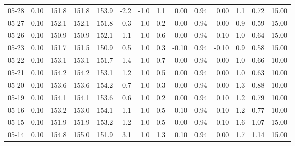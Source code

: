 \begin{threeparttable}
{\begin{tabular}{lrrrrrrrrrrrrr}
  05-28 &     0.10 & 151.8 & 151.8 & 153.9 &       -2.2 &                     -1.0 &                 1.1 &       0.00 &      0.94 &           0.00 &              1.1 &            0.72 &                  15.00 \\
  05-27 &     0.10 & 152.1 & 152.1 & 151.8 &        0.3 &                      1.0 &                 0.2 &       0.00 &      0.94 &           0.00 &              0.9 &            0.59 &                  15.00 \\
  05-26 &     0.10 & 150.9 & 150.9 & 152.1 &       -1.1 &                     -1.0 &                 0.6 &       0.00 &      0.94 &           0.10 &              1.0 &            0.64 &                  15.00 \\
  05-23 &     0.10 & 151.7 & 151.5 & 150.9 &        0.5 &                      1.0 &                 0.3 &      -0.10 &      0.94 &          -0.10 &              0.9 &            0.58 &                  15.00 \\
  05-22 &     0.10 & 153.1 & 153.1 & 151.7 &        1.4 &                      1.0 &                 0.7 &       0.00 &      0.94 &           0.00 &              1.0 &            0.66 &                  10.00 \\
  05-21 &     0.10 & 154.2 & 154.2 & 153.1 &        1.2 &                      1.0 &                 0.5 &       0.00 &      0.94 &           0.00 &              1.0 &            0.63 &                  10.00 \\
  05-20 &     0.10 & 153.6 & 153.6 & 154.2 &       -0.7 &                     -1.0 &                 0.3 &       0.00 &      0.94 &           0.00 &              1.3 &            0.88 &                  10.00 \\
  05-19 &     0.10 & 154.1 & 154.1 & 153.6 &        0.6 &                      1.0 &                 0.2 &       0.00 &      0.94 &           0.10 &              1.2 &            0.79 &                  10.00 \\
  05-16 &     0.10 & 153.2 & 153.0 & 154.1 &       -1.1 &                     -1.0 &                 0.5 &      -0.10 &      0.94 &          -0.10 &              1.2 &            0.77 &                  10.00 \\
  05-15 &     0.10 & 151.9 & 151.9 & 153.2 &       -1.2 &                     -1.0 &                 0.5 &       0.00 &      0.94 &          -0.10 &              1.6 &            1.07 &                  15.00 \\
  05-14 &     0.10 & 154.8 & 155.0 & 151.9 &        3.1 &                      1.0 &                 1.3 &       0.10 &      0.94 &           0.00 &              1.7 &            1.14 &                  15.00 \\

\end{tabular}}
\end{threeparttable}
